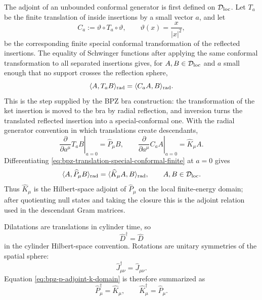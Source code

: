 The adjoint of an unbounded conformal generator is first defined on
\(\mathcal D_{\rm loc}\).  Let \(T_a\) be the finite translation of inside
insertions by a small vector \(a\), and let
\begin{equation}
  C_a:=\vartheta\circ T_a\circ\vartheta,
  \qquad
  \vartheta(x)=\frac{x}{|x|^2},
  \label{eq:sct-as-reflected-translation}
\end{equation}
be the corresponding finite special conformal transformation of the reflected
insertions.  The equality of Schwinger functions after applying the same
conformal transformation to all separated insertions gives, for
\(A,B\in\mathcal D_{\rm loc}\) and \(a\) small enough that no support crosses the
reflection sphere,
\begin{equation}
  \langle A,T_a B\rangle_{\rm rad}
  =
  \langle C_a A,B\rangle_{\rm rad}.
  \label{eq:bpz-translation-special-conformal-finite}
\end{equation}
This is the step supplied by the BPZ bra construction: the transformation of
the ket insertion is moved to the bra by radial reflection, and inversion
turns the translated reflected insertion into a special-conformal one.  With
the radial generator convention in which translations create descendants,
\[
  \left.\frac{\partial}{\partial a^\mu}T_a B\right|_{a=0}
  =
  \widehat P_\mu B,
  \qquad
  \left.\frac{\partial}{\partial a^\mu}C_a A\right|_{a=0}
  =
  \widehat K_\mu A .
\]
Differentiating
\eqref{eq:bpz-translation-special-conformal-finite} at \(a=0\) gives
\begin{equation}
  \langle A,\widehat P_\mu B\rangle_{\rm rad}
  =
  \langle \widehat K_\mu A,B\rangle_{\rm rad},
  \qquad A,B\in\mathcal D_{\rm loc}.
  \label{eq:bpz-p-adjoint-k-domain}
\end{equation}
Thus \(\widehat K_\mu\) is the Hilbert-space adjoint of \(\widehat P_\mu\) on
the local finite-energy domain; after quotienting null states and taking the
closure this is the adjoint relation used in the descendant Gram matrices.

Dilatations are translations in cylinder time, so
\[
  \widehat D^\dagger=\widehat D
\]
in the cylinder Hilbert-space convention.  Rotations are unitary symmetries
of the spatial sphere:
\[
  \widehat J_{\mu\nu}^\dagger=\widehat J_{\mu\nu}.
\]
Equation \eqref{eq:bpz-p-adjoint-k-domain} is therefore summarized as
\begin{equation}
  \widehat P_\mu^\dagger=\widehat K_\mu,
  \qquad
  \widehat K_\mu^\dagger=\widehat P_\mu .
  \label{eq:radial-adjoint-p-k}
\end{equation}

